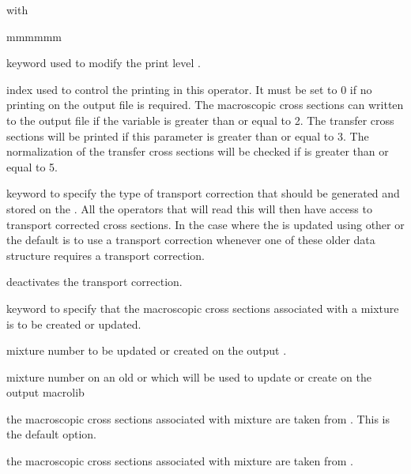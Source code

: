 \noindent with
\begin{ListeDeDescription}{mmmmmm}

\item[\moc{EDIT}] keyword used to modify the print level .

\item[\dusa{iprint}] index used to control the printing in this operator.
It must be set to 0 if no printing on the output file is required. The
macroscopic cross sections can written to the output file if the
variable  is greater than or equal to 2. The transfer cross
sections will be printed if this parameter is greater than or equal to 3. The
normalization of the transfer cross sections will be checked if 
is greater than or equal to 5.

\item[\moc{CTRA}] keyword to specify the type of transport correction that
should be generated and stored on the . All the operators that
will read this  will then have access to transport corrected
cross sections. In the case where the  is updated using other
 or  the default is to use a transport correction whenever one of these
older data structure requires a transport correction.

\item[\moc{OFF}] deactivates the transport correction.

\item[\moc{MIX}] keyword to specify that the macroscopic cross sections
associated with a mixture is to be created or updated.

\item[\dusa{numnew}] mixture number to be updated or created on the output
. 

\item[\dusa{numold}] mixture number on an old  or  which will be used
to update or create  on the output macrolib 

\item[\moc{OLDL}] the
macroscopic cross sections associated with mixture  are taken from . This is the
default option.

\item[\moc{UPDL}] the
macroscopic cross sections associated with mixture  are taken from .

\end{ListeDeDescription}

\eject

